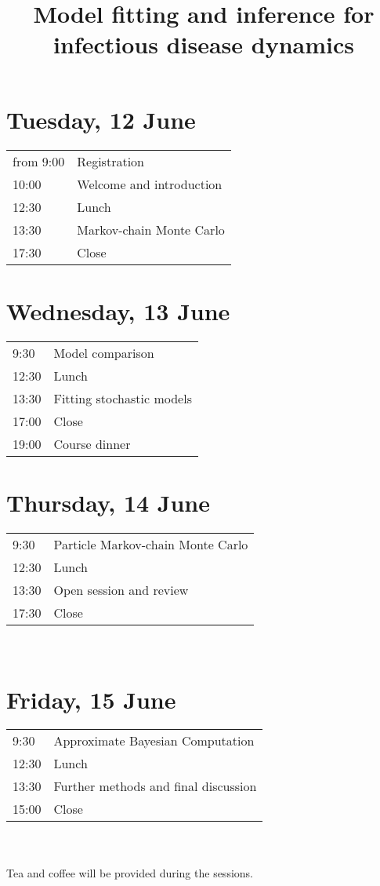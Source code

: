 \documentclass[a4paper]{article}
\title{Model fitting and inference for\\infectious disease dynamics}
\author{}
\date{}
\begin{document}
\maketitle

\section*{Tuesday, 12 June}
\label{sec:tuesday}

\begin{tabular}{R{1.5cm} l}
from 9:00 & Registration\\
10:00 & Welcome and introduction\\
12:30 & Lunch\\
13:30 & Markov-chain Monte Carlo\\
17:30 & Close\\
\end{tabular}

\section*{Wednesday, 13 June}
\label{sec:wednesday}
\begin{tabular}{R{1.5cm} l}
9:30 & Model comparison\\
12:30 & Lunch\\
13:30 & Fitting stochastic models\\
17:00 & Close\\
19:00 & Course dinner
\end{tabular}

\section*{Thursday, 14 June}
\label{sec:thursday}
\begin{tabular}{R{1.5cm} l}
9:30 & Particle Markov-chain Monte Carlo\\
12:30 & Lunch\\
13:30 & Open session and review\\
17:30 & Close\\
\end{tabular}\\

\section*{Friday, 15 June}
\label{sec:thursday}
\begin{tabular}{R{1.5cm} l}
9:30 & Approximate Bayesian Computation\\
12:30 & Lunch\\
13:30 & Further methods and final discussion\\
15:00 & Close\\
\end{tabular}\\
\vspace{0.5cm}\\
Tea and coffee will be provided during the sessions.
\end{document}

